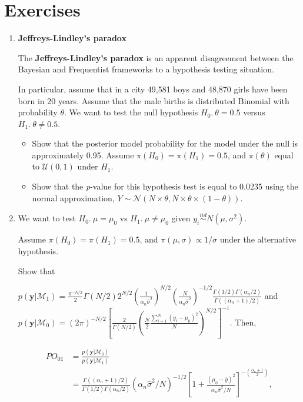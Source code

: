 \section{Exercises}\label{sec28}
\begin{enumerate}
\item \textbf{Jeffreys-Lindley's paradox}

The \textbf{Jeffreys-Lindley's paradox} \cite{Jeffreys1961,lindley1957statistical} is an apparent disagreement between the Bayesian and Frequentist frameworks to a hypothesis testing situation.

In particular, assume that in a city 49,581 boys and 48,870 girls have been born in 20 years. Assume that the male births is distributed Binomial with probability $\theta$. We want to test the null hypothesis $H_0. \ \theta=0.5$ versus $H_1. \ \theta\neq 0.5$.

\begin{itemize}
	\item Show that the posterior model probability for the model under the null is approximately 0.95. Assume $\pi(H_0)=\pi(H_1)=0.5$, and $\pi(\theta)$ equal to $\mathcal{U}(0,1)$ under $H_1$.
	\item Show that the \textit{p}-value for this hypothesis test is equal to 0.0235 using the normal approximation, $Y\sim \mathcal{N}(N\times \theta, N\times \theta \times (1-\theta))$. 
\end{itemize}

\item We want to test $H_0. \ \mu=\mu_0$ vs $H_1. \ \mu \neq \mu_0$ given $y_i\stackrel{iid}{\sim}N(\mu,\sigma^2)$.

Assume $\pi(H_0)=\pi(H_1)=0.5$, and $\pi(\mu,\sigma)\propto 1/\sigma$ under the alternative hypothesis.

Show that

$p(\mathbf{y}|\mathcal{M}_1)=\frac{\pi^{-N/2}}{2}\Gamma(N/2)2^{N/2}\left(\frac{1}{\alpha_n\hat{\sigma}^2}\right)^{N/2}\left(\frac{N}{\alpha_n\hat{\sigma}^2}\right)^{-1/2}\frac{\Gamma(1/2)\Gamma(\alpha_n/2)}{\Gamma((\alpha_n+1)/2)}$ and $p(\mathbf{y}|\mathcal{M}_0)=(2\pi)^{-N/2}\left[\frac{2}{\Gamma(N/2)}\left(\frac{N}{2}\frac{\sum_{i=1}^N(y_i-\mu_0)^2}{N}\right)^{N/2}\right]^{-1}$. Then,

\begin{align*}
	PO_{01}&=\frac{p(\mathbf{y}|\mathcal{M}_0)}{p(\mathbf{y}|\mathcal{M}_1)}\\
	& =\frac{\Gamma((\alpha_n+1)/2)}{\Gamma(1/2)\Gamma(\alpha_n/2)}(\alpha_n\hat{\sigma}^2/N)^{-1/2}\left[1+\frac{(\mu_0-\bar{y})^2}{\alpha_n\hat{\sigma}^2/N}\right]^{-\left(\frac{\alpha_n+1}{2}\right)},
\end{align*}


\end{enumerate}
